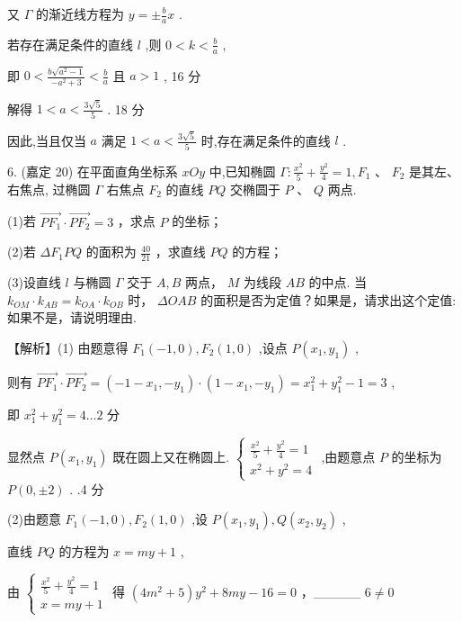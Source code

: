 \documentclass[10pt]{article}
\begin{document}
又 \(\Gamma\) 的渐近线方程为 \(y =  \pm  \frac{b}{a}x\) .

若存在满足条件的直线 \(l\) ,则 \(0 < k < \frac{b}{a}\) ,

即 \(0 < \frac{b\sqrt{{a}^{2} - 1}}{-{a}^{2} + 3} < \frac{b}{a}\) 且 \(a > 1\) , 16 分

解得 \(1 < a < \frac{3\sqrt{5}}{5}\) . 18 分

因此,当且仅当 \(a\) 满足 \(1 < a < \frac{3\sqrt{5}}{5}\) 时,存在满足条件的直线 \(l\) .

6. (嘉定 20) 在平面直角坐标系 \({xOy}\) 中,已知椭圆 \(\Gamma  : \frac{{x}^{2}}{5} + \frac{{y}^{2}}{4} = 1,{F}_{1}\text{ 、 }{F}_{2}\) 是其左、右焦点, 过椭圆 \(\Gamma\) 右焦点 \({F}_{2}\) 的直线 \({PQ}\) 交椭圆于 \(P\text{ 、 }Q\) 两点.

(1)若 \(\overrightarrow{P{F}_{1}} \cdot  \overrightarrow{P{F}_{2}} = 3\) ，求点 \(P\) 的坐标；

(2)若 \(\Delta {F}_{1}{PQ}\) 的面积为 \(\frac{40}{21}\) ，求直线 \({PQ}\) 的方程；

(3)设直线 \(l\) 与椭圆 \(\Gamma\) 交于 \(A,B\) 两点， \(M\) 为线段 \({AB}\) 的中点. 当 \({k}_{OM} \cdot  {k}_{AB} = {k}_{OA} \cdot  {k}_{OB}\) 时， \({\Delta OAB}\) 的面积是否为定值？如果是，请求出这个定值:如果不是，请说明理由.

【解析】(1) 由题意得 \({F}_{1}\left( {-1,0}\right) ,{F}_{2}\left( {1,0}\right)\) ,设点 \(P\left( {{x}_{1},{y}_{1}}\right)\) ,

则有 \(\overrightarrow{P{F}_{1}} \cdot  \overrightarrow{P{F}_{2}} = \left( {-1 - {x}_{1}, - {y}_{1}}\right)  \cdot  \left( {1 - {x}_{1}, - {y}_{1}}\right)  = {x}_{1}^{2} + {y}_{1}^{2} - 1 = 3\) ,

即 \({x}_{1}^{2} + {y}_{1}^{2} = 4\ldots 2\) 分

显然点 \(P\left( {{x}_{1},{y}_{1}}\right)\) 既在圆上又在椭圆上. \(\left\{  \begin{array}{l} \frac{{x}^{2}}{5} + \frac{{y}^{2}}{4} = 1 \\  {x}^{2} + {y}^{2} = 4 \end{array}\right.\) ,由题意点 \(P\) 的坐标为 \(P\left( {0, \pm  2}\right)\) . .4 分

(2)由题意 \({F}_{1}\left( {-1,0}\right) ,{F}_{2}\left( {1,0}\right)\) ,设 \(P\left( {{x}_{1},{y}_{1}}\right) ,Q\left( {{x}_{2},{y}_{2}}\right)\) ,

直线 \({PQ}\) 的方程为 \(x = {my} + 1\) ,

由 \(\left\{  \begin{array}{l} \frac{{x}^{2}}{5} + \frac{{y}^{2}}{4} = 1 \\  x = {my} + 1 \end{array}\right.\) 得 \(\left( {4{m}^{2} + 5}\right) {y}^{2} + {8my} - {16} = 0\) ，\_\_\_\_\_ \(6 \neq  0\)
\end{document}
